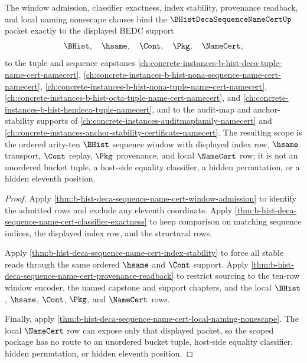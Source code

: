 \begin{theorem}
\label{thm:b-hist-deca-sequence-name-cert-scoped-support-package}
The window admission, classifier exactness, index stability, provenance readback, and local naming nonescape clauses bind the $\BHistDecaSequenceNameCertUp$ packet exactly to the displayed BEDC support
$$
\BHist,\quad \hsame,\quad \Cont,\quad \Pkg,\quad \NameCert,
$$
to the tuple and sequence capstones
\autoref{ch:concrete-instances-b-hist-deca-tuple-name-cert-namecert},
\autoref{ch:concrete-instances-b-hist-nona-sequence-name-cert-namecert},
\autoref{ch:concrete-instances-b-hist-nona-tuple-name-cert-namecert},
\autoref{ch:concrete-instances-b-hist-octa-tuple-name-cert-namecert},
and \autoref{ch:concrete-instances-b-hist-hendeca-tuple-namecert}, and to the audit-map and anchor-stability supports of \autoref{ch:concrete-instances-auditmapfamily-namecert} and \autoref{ch:concrete-instances-anchor-stability-certificate-namecert}. The resulting scope is the ordered arity-ten $\BHist$ sequence window with displayed index row, $\hsame$ transport, $\Cont$ replay, $\Pkg$ provenance, and local $\NameCert$ row; it is not an unordered bucket tuple, a host-side equality classifier, a hidden permutation, or a hidden eleventh position.
\end{theorem}
\begin{proof}
Apply \autoref{thm:b-hist-deca-sequence-name-cert-window-admission} to identify the admitted rows and exclude any eleventh coordinate. Apply \autoref{thm:b-hist-deca-sequence-name-cert-classifier-exactness} to keep comparison on matching sequence indices, the displayed index row, and the structural rows.

Apply \autoref{thm:b-hist-deca-sequence-name-cert-index-stability} to force all stable reads through the same ordered $\hsame$ and $\Cont$ support. Apply \autoref{thm:b-hist-deca-sequence-name-cert-provenance-readback} to restrict sourcing to the ten-row window encoder, the named capstone and support chapters, and the local $\BHist$, $\hsame$, $\Cont$, $\Pkg$, and $\NameCert$ rows.

Finally, apply \autoref{thm:b-hist-deca-sequence-name-cert-local-naming-nonescape}. The local $\NameCert$ row can expose only that displayed packet, so the scoped package has no route to an unordered bucket tuple, host-side equality classifier, hidden permutation, or hidden eleventh position.
\end{proof}


